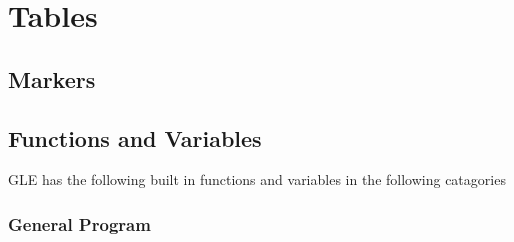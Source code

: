 \appendix
\chapter{Tables}
\section{Markers}
\mbox{}

\section{Functions and Variables}
\label{fct:sec}

GLE has the following built in functions and variables in the following catagories

\subsection{General Program}


